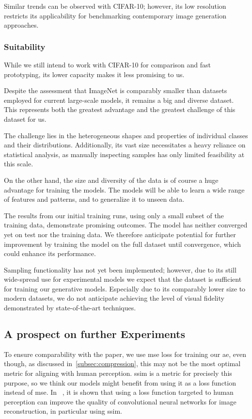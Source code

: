 Similar trends can be observed with CIFAR-10; however, its low resolution restricts its applicability for
benchmarking contemporary image generation approaches.

\subsubsection{Suitability}
While we still intend to work with CIFAR-10 for comparison and fast prototyping, its lower capacity makes it less
promising to us.

Despite the assessment that ImageNet is comparably smaller than datasets employed for current large-scale
models, it remains a big and diverse dataset.
This represents both the greatest advantage and the greatest challenge of this dataset for us.

The challenge lies in the heterogeneous shapes and properties of individual classes and their distributions.
Additionally, its vast size necessitates a heavy reliance on statistical analysis, as manually inspecting samples has
only limited feasibility at this scale.

On the other hand, the size and diversity of the data is of course a huge advantage for training the models.
The models will be able to learn a wide range of features and patterns, and to generalize it to unseen data.

The results from our initial training runs, using only a small subset of the training data, demonstrate promising
outcomes.
The model has neither converged yet on test nor the training data.
We therefore anticipate potential for further improvement by training the model on the full dataset until
convergence, which could enhance its performance.

Sampling functionality has not yet been implemented; however, due to its still wide-spread use for experimental
models we expect that the dataset is sufficient for training our generative models.
Especially due to its comparably lower size to modern datasets, we do not anticipate achieving the level of visual
fidelity demonstrated by state-of-the-art techniques.

\subsection{A prospect on further Experiments}\label{subsec:further-ideas}
To ensure comparability with the paper, we use \ac{mse} loss for training our \ac{ae}, even though, as discussed in~\ref{subsec:compression}, this may not be the most optimal metric for aligning with human perception.
\ac{ssim} is a metric for precisely this purpose, so we think our models might benefit from using it as a loss
function instead of \ac{mse}.
In ~\cite{ssim_as_loss}, it is shown that using a loss function targeted to human perception can improve the quality
of convolutional neural networks for image reconstruction, in particular using \ac{ssim}.

